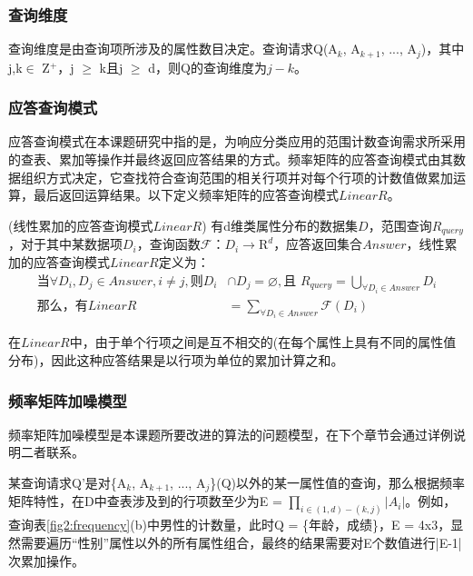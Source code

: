 \subsubsection{查询维度}
查询维度是由查询项所涉及的属性数目决定。查询请求Q(A$_{k}$, A$_{k+1}$, ..., A$_{j}$)，其中j,k$\in$ Z$^{+}$，j $\geqslant$ k且j $\geqslant$ d，则Q的查询维度为$j-k$。

\subsubsection{应答查询模式}
\label{chap2_Linaer}

应答查询模式在本课题研究中指的是，为响应分类应用的范围计数查询需求所采用的查表、累加等操作并最终返回应答结果的方式。频率矩阵的应答查询模式由其数据组织方式决定，它查找符合查询范围的相关行项并对每个行项的计数值做累加运算，最后返回运算结果。以下定义频率矩阵的应答查询模式$LinearR$。

\begin{defn}
	(\textsc{线性累加的应答查询模式$LinearR$}) 有d维类属性分布的数据集$D$，范围查询$R_{query}$，对于其中某数据项$D_{i}$，查询函数$\mathcal{F}$：$D_{i} \rightarrow \mathrm{R}^d$，应答返回集合$Answer$，线性累加的应答查询模式$LinearR$定义为：
	\begin{equation*}
	\label{eq:linear_response}
		\begin{split}
			\text{当}\forall D_{i},D_{j} \in Answer, i \neq j, \text{则} D_{i} &\cap D_{j} = \varnothing,\text{且 }
			R_{query} = \bigcup\limits_{\forall D_{i} \in Answer} D_{i}\\
			\text{那么，有}LinearR &= \sum\limits_{\forall D_{i} \in Answer} \mathcal{F}(D_{i})
		\end{split}
	\end{equation*}
\end{defn}

在$LinearR$中，由于单个行项之间是互不相交的(在每个属性上具有不同的属性值分布)，因此这种应答结果是以行项为单位的累加计算之和。

\subsubsection{频率矩阵加噪模型}

频率矩阵加噪模型是本课题所要改进的算法的问题模型，在下个章节会通过详例说明二者联系。

某查询请求Q'是对\{A$_{k}$, A$_{k+1}$, ..., A$_{j}$\}(Q)以外的某一属性值的查询，那么根据频率矩阵特性，在D中查表涉及到的行项数至少为E = \(\prod\nolimits_{i \in (1,d) - (k,j)} {|A{_i} |} \)。例如，查询表\ref{fig2:frequency}(b)中男性的计数量，此时Q = \{年龄，成绩\}，E = 4x3，显然需要遍历“性别”属性以外的所有属性组合，最终的结果需要对E个数值进行|E-1|次累加操作。

